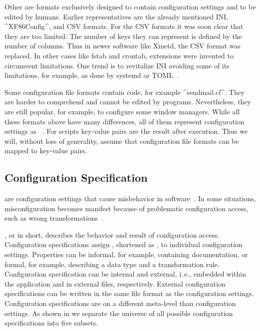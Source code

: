 Other  are formats exclusively designed to contain configuration settings and to be edited by humans.
Earlier representatives are the already mentioned INI, ^XF86Config^, and CSV formats.
For the CSV formats it was soon clear that they are too limited:
The number of keys they can represent is defined by the number of columns.
Thus in newer software like Xinetd, the CSV format was replaced.
In other cases like fstab and crontab, extensions were invented to circumvent limitations.
One trend is to revitalize INI avoiding some of its limitations, for example, as done by systemd or TOML~\cite{papagiannopoulos2015json}.

Some configuration file formats contain code, for example ^sendmail.cf^.
They are harder to comprehend and cannot be edited by programs.
Nevertheless, they are still popular, for example, to configure some window managers.
While all these formats above have many differences, all of them represent configuration settings as ~\cite{jin2014configurations,rabkin2011static,xu2013blame,lathia2013open}.
For scripts key-value pairs are the result after execution.
Thus we will, without loss of generality, assume that configuration file formats can be mapped to key-value pairs.




\subsection{Configuration Specification}


 are configuration settings that cause misbehavior in software~\cite{yin2011empirical,mahajan2002bgp}.
In some situations, misconfiguration becomes manifest because of problematic configuration access, such as wrong transformations~\cite{xu2013blame}.


, or  in short, describes the behavior and result of configuration access.
Configuration specifications assign , shortened as , to individual configuration settings.
Properties can be informal, for example, containing documentation, or formal, for example, describing a data type and a transformation rule.
Configuration specification can be internal and external, i.\,e., embedded within the application and in external files, respectively.
External configuration specifications can be written in the same file format as the configuration settings.
Configuration specifications are on a different meta-level than configuration settings.
As shown in  we separate the universe of all possible configuration specifications into five subsets.

